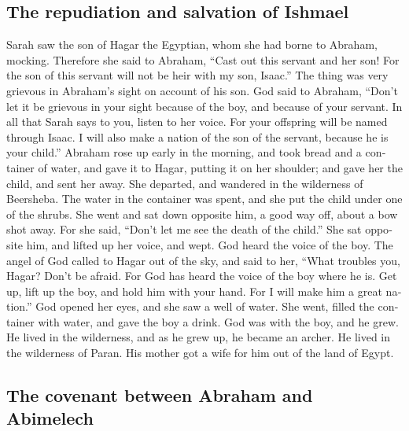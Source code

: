 \begin{paracol}{2}
\begin{otherlanguage}{english}
\hypertarget{the-repudiation-and-salvation-of-ishmael}{%
\subsection{The repudiation and salvation of
Ishmael}\label{the-repudiation-and-salvation-of-ishmael}}

 Sarah saw the son of Hagar the Egyptian, whom she had
borne to Abraham, mocking.  Therefore she said to
Abraham, ``Cast out this servant and her son! For the son of this
servant will not be heir with my son, Isaac.''  The thing
was very grievous in Abraham's sight on account of his son.
 God said to Abraham, ``Don't let it be grievous in your
sight because of the boy, and because of your servant. In all that Sarah
says to you, listen to her voice. For your offspring will be named
through Isaac.  I will also make a nation of the son of
the servant, because he is your child.''  Abraham rose up
early in the morning, and took bread and a container of water, and gave
it to Hagar, putting it on her shoulder; and gave her the child, and
sent her away. She departed, and wandered in the wilderness of
Beersheba.  The water in the container was spent, and she
put the child under one of the shrubs.  She went and sat
down opposite him, a good way off, about a bow shot away. For she said,
``Don't let me see the death of the child.'' She sat opposite him, and
lifted up her voice, and wept.  God heard the voice of
the boy. The angel of God called to Hagar out of the sky, and said to
her, ``What troubles you, Hagar? Don't be afraid. For God has heard the
voice of the boy where he is.  Get up, lift up the boy,
and hold him with your hand. For I will make him a great nation.''
 God opened her eyes, and she saw a well of water. She
went, filled the container with water, and gave the boy a drink.
 God was with the boy, and he grew. He lived in the
wilderness, and as he grew up, he became an archer.  He
lived in the wilderness of Paran. His mother got a wife for him out of
the land of Egypt.

\hypertarget{the-covenant-between-abraham-and-abimelech}{%
\subsection{The covenant between Abraham and
Abimelech}\label{the-covenant-between-abraham-and-abimelech}}


\end{otherlanguage}
\end{paracol}
